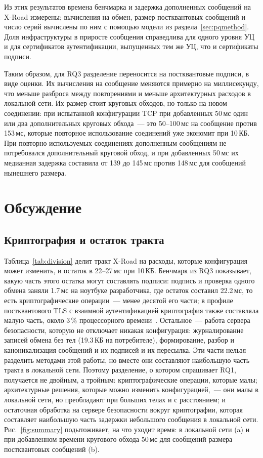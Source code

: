 \documentclass[conference,a4paper]{IEEEtran}
\newcommand{\newtext}[1]{{\color{blue}#1}}
\newcommand{\newred}[1]{{\color{red}#1}}
\begin{document}
{\newred{Из этих результатов времена бенчмарка и задержка дополненных сообщений на X-Road
измерены; вычисления на обмен, размер постквантовых сообщений и число серий
вычислены по ним с помощью модели из раздела~\ref{sec:pqmethod}. Доля инфраструктуры
в приросте сообщения справедлива для одного уровня УЦ и для сертификатов аутентификации, выпущенных
тем же УЦ, что и сертификаты подписи.}

Таким образом, для RQ3 разделение переносится на постквантовые подписи\newred{, в виде оценки}. Их вычисления на сообщение
меняются примерно на миллисекунду, что меньше разброса между повторениями и меньше
архитектурных расходов в локальной сети. Их размер стоит круговых обходов, но только на новом
соединении\newred{: при испытанной конфигурации TCP} при добавленных 50\,мс один или два дополнительных
круговых обхода~--- это 50--100\,мс на сообщение против 153\,мс, которые повторное использование соединений уже экономит при
10\,КБ\newred{. При повторно используемых соединениях дополненным сообщениям не потребовался дополнительный круговой обход, и при
добавленных 50\,мс их медианная задержка составила от 139 до 145\,мс против 148\,мс для сообщений нынешнего
размера}.\par}

\section{Обсуждение}

\subsection{\newtext{Криптография и остаток тракта}}\label{sec:remainder}

\newtext{Таблица~\ref{tab:division} делит тракт X-Road на расходы, которые конфигурация может
изменить, и остаток в 22--27\,мс при 10\,КБ. Бенчмарк из RQ3 показывает, какую часть этого
остатка могут составлять подписи: подпись и проверка одного обмена заняли 1.7\,мс на ноутбуке
разработчика, где остаток составил 22.2\,мс, то есть криптографические операции~--- менее десятой
его части; в профиле постквантового TLS с взаимной аутентификацией криптография также составляла малую
часть, около 3\,\% процессорного времени~\cite{rahul2026}. Остальное~--- работа сервера безопасности, которую не отключает никакая конфигурация: журналирование записей
обмена без тел (19.3\,КБ на потребителе), формирование, разбор и каноникализация
сообщений и их подписей и их пересылка. Эти части нельзя разделить
методами этой работы, но вместе они составляют наибольшую часть тракта в локальной сети.
Поэтому разделение, о котором спрашивает RQ1, получается не двойным, а тройным: криптографические операции,
которые малы; архитектурные решения, которые можно изменить конфигурацией,~--- они малы в
локальной сети, но преобладают при больших телах и с расстоянием; и \newred{остаточная обработка} на
сервере безопасности вокруг криптографии, которая составляет наибольшую часть задержки небольшого сообщения
в локальной сети.} \newtext{Рис.~\ref{fig:summary} подытоживает, на что уходит время: в
локальной сети (a) и при добавленном времени кругового обхода 50\,мс для сообщений размера
постквантовых сообщений (b).}
\end{document}

